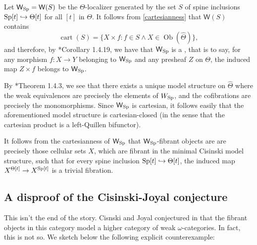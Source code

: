 Let \(\mathsf{W}_{{\operatorname{Sp}}}=\mathsf{W}(S)\) be the \(\Theta\)-localizer generated by the set \(S\) of spine inclusions \({\operatorname{Sp}}[t]\hookrightarrow \Theta[t]\) for all \([t]\) in \(\Theta\).   It follows from \eqref{cartesianness} that \(\mathsf{W}(S)\) contains \[\operatorname{cart}(S)=\{X\times f: f\in S\wedge X\in \operatorname{Ob}(\widehat{\Theta})\},\] and therefore, by \cite{cisinski-book}*{Corollary 1.4.19}, we have that \(\mathsf{W}_{{\operatorname{Sp}}}\) is a , that is to say, for any morphism \(f:X\to Y\) belonging to \(\mathsf{W}_{{\operatorname{Sp}}}\) and any presheaf \(Z\) on \(\Theta\), the induced map \(Z\times f\) belongs to \(\mathsf{W}_{{\operatorname{Sp}}}\).   

By \cite{cisinski-book}*{Theorem 1.4.3}, we see that there exists a unique model structure on \(\widehat{\Theta}\) where the weak equivalences are precisely the elements of \(W_{{\operatorname{Sp}}}\), and the cofibrations are precisely the monomorphisms.  Since \(\mathsf{W}_{{\operatorname{Sp}}}\) is cartesian, it follows easily that the aforementioned model structure is cartesian-closed (in the sense that the cartesian product is a left-Quillen bifunctor).  

It follows from the cartesianness of \(\mathsf{W}_{{\operatorname{Sp}}}\) that \(\mathsf{W}_{{\operatorname{Sp}}}\)-fibrant objects are are precisely those cellular sets \(X\), which are fibrant in the minimal Cisinski model structure, such that for every spine inclusion \({\operatorname{Sp}}[t]\hookrightarrow \Theta[t]\), the induced map \(X^{\Theta[t]}\to X^{{\operatorname{Sp}}[t]}\) is a trivial fibration.

\subsection{A disproof of the Cisinski-Joyal conjecture}
This isn't the end of the story.  Cisnski and Joyal conjectured in \cite{joyal-quategory} that the fibrant objects in this category model a higher category of weak \(\omega\)-categories.  In fact, this is not so. We sketch below the following explicit counterexample:

